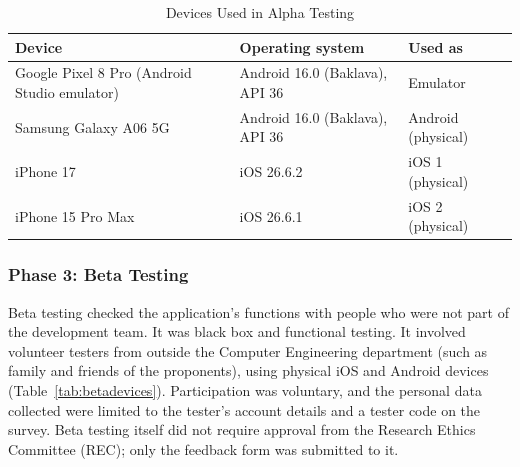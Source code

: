 \begin{table}[htbp]
    \centering
    \caption{Devices Used in Alpha Testing}
    \label{tab:devices}
    \small
    \renewcommand{\arraystretch}{1.2}
    \begin{tabular}{|>{\raggedright\arraybackslash}p{}|>{\raggedright\arraybackslash}p{}|>{\raggedright\arraybackslash}p{}|}
        \hline
        \textbf{Device} & \textbf{Operating system} & \textbf{Used as} \\
        \hline
        Google Pixel 8 Pro (Android Studio emulator) & Android 16.0 (Baklava), API 36 & Emulator \\
        Samsung Galaxy A06 5G & Android 16.0 (Baklava), API 36 & Android (physical) \\
        iPhone 17 & iOS 26.6.2 & iOS 1 (physical) \\
        iPhone 15 Pro Max & iOS 26.6.1 & iOS 2 (physical) \\
        \hline
    \end{tabular}
\end{table}

\subsubsection{Phase 3: Beta Testing}
Beta testing checked the application's functions with people who were not part of the development team. It was black box and functional testing. It involved volunteer testers from outside the Computer Engineering department (such as family and friends of the proponents), using physical iOS and Android devices (Table~\ref{tab:betadevices}). Participation was voluntary, and the personal data collected were limited to the tester's account details and a tester code on the survey. Beta testing itself did not require approval from the Research Ethics Committee (REC); only the feedback form was submitted to it.

